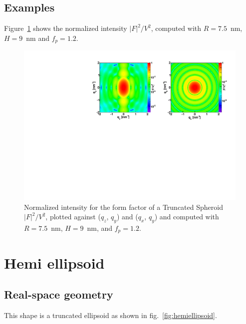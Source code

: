 \subsection{Examples}
Figure~\ref{fig:FFspheroidEx} shows the normalized intensity
$|F|^2/V^2$, computed with $R=7.5$~nm, $H=9$~nm and $f_p=1.2$.

\begin{figure}[h]
\begin{center}
\includegraphics[width=\textwidth]{Figures/figffspheroid}
\end{center}
\caption{Normalized intensity for the form factor of a Truncated Spheroid
  $|F|^2/V^2$, plotted against ($q_z$, $q_y$) and ($q_x$, $q_y$) and
  computed with $R=7.5$~nm, $H=9$~nm, and $f_p=1.2$.}
\label{fig:FFspheroidEx}
\end{figure}

\FloatBarrier


\newpage{\cleardoublepage}
\section{Hemi ellipsoid}   

\subsection{Real-space geometry}
This shape is a truncated ellipsoid as shown in fig.~\ref{fig:hemiellipsoid}.

